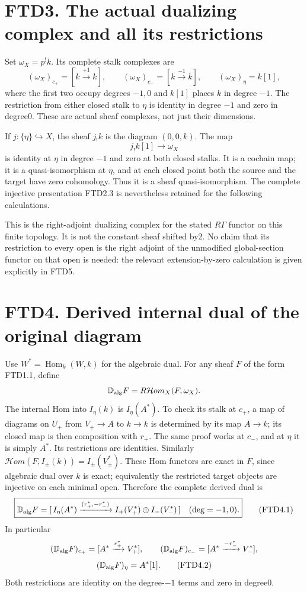 \section{FTD3. The actual dualizing complex and all its
restrictions}\label{ftd3.-the-actual-dualizing-complex-and-all-its-restrictions}

Set \(\omega_X=p^!k\). Its complete stalk complexes are \[
(\omega_X)_{c_+}=[k\xrightarrow{+1}k],\qquad
(\omega_X)_{c_-}=[k\xrightarrow{-1}k],\qquad
(\omega_X)_\eta=k[1],
\tag{FTD3.1}
\] where the first two occupy degrees \(-1,0\) and \(k[1]\) places \(k\)
in degree \(-1\). The restriction from either closed stalk to \(\eta\)
is identity in degree \(-1\) and zero in degree0. These are actual sheaf
complexes, not just their dimensions.

If \(j:\{\eta\}\hookrightarrow X\), the sheaf \(j_!k\) is the diagram
\((0,0,k)\). The map \[
j_!k[1]\longrightarrow\omega_X
\tag{FTD3.2}
\] is identity at \(\eta\) in degree \(-1\) and zero at both closed
stalks. It is a cochain map; it is a quasi-isomorphism at \(\eta\), and
at each closed point both the source and the target have zero
cohomology. Thus it is a sheaf quasi-isomorphism. The complete injective
presentation FTD2.3 is nevertheless retained for the following
calculations.

This is the right-adjoint dualizing complex for the stated \(R\Gamma\)
functor on this finite topology. It is not the constant sheaf shifted
by2. No claim that its restriction to every open is the right adjoint of
the unmodified global-section functor on that open is needed: the
relevant extension-by-zero calculation is given explicitly in FTD5.

\section{FTD4. Derived internal dual of the original
diagram}\label{ftd4.-derived-internal-dual-of-the-original-diagram}

Use \(W^*=\operatorname{Hom}_k(W,k)\) for the algebraic dual. For any
sheaf \(F\) of the form FTD1.1, define \[
\mathbb D_{\rm alg}F=R\mathcal Hom_X(F,\omega_X).
\] The internal Hom into \(I_\eta(k)\) is \(I_\eta(A^*)\). To check its
stalk at \(c_+\), a map of diagrams on \(U_+\) from \(V_+\to A\) to
\(k\to k\) is determined by its map \(A\to k\); its closed map is then
composition with \(r_+\). The same proof works at \(c_-\), and at
\(\eta\) it is simply \(A^*\). Its restrictions are identities.
Similarly \(\mathcal Hom(F,I_\pm(k))=I_\pm(V_\pm^*)\). These Hom
functors are exact in \(F\), since algebraic dual over \(k\) is exact;
equivalently the restricted target objects are injective on each minimal
open. Therefore the complete derived dual is \[
\boxed{
\mathbb D_{\rm alg}F=
[\,I_\eta(A^*)\xrightarrow{(r_+^*,-r_-^*)}
I_+(V_+^*)\oplus I_-(V_-^*)\,]
\quad(\deg=-1,0).}
\tag{FTD4.1}
\] In particular \[
(\mathbb D_{\rm alg}F)_{c_+}
=[A^*\xrightarrow{r_+^*}V_+^*],\qquad
(\mathbb D_{\rm alg}F)_{c_-}
=[A^*\xrightarrow{-r_-^*}V_-^*],
\] \[
(\mathbb D_{\rm alg}F)_\eta=A^*[1].
\tag{FTD4.2}
\] Both restrictions are identity on the degree-\(-1\) terms and zero in
degree0.

